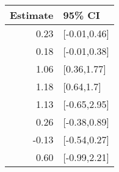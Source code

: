 \begin{tabular}{rl}
  \hline
Estimate & 95\% CI \\ 
  \hline
0.23 & [-0.01,0.46] \\ 
  0.18 & [-0.01,0.38] \\ 
  1.06 & [0.36,1.77] \\ 
  1.18 & [0.64,1.7] \\ 
  1.13 & [-0.65,2.95] \\ 
  0.26 & [-0.38,0.89] \\ 
  -0.13 & [-0.54,0.27] \\ 
  0.60 & [-0.99,2.21] \\ 
   \hline
\end{tabular}


